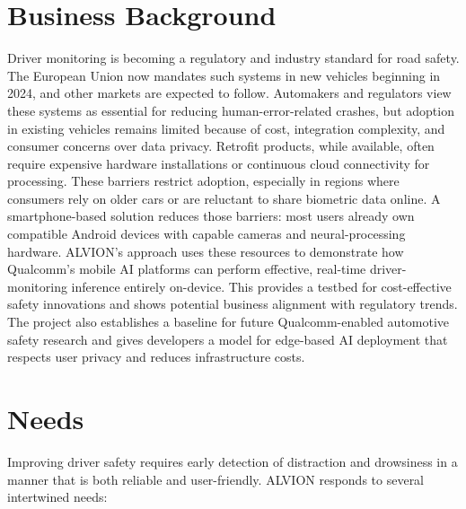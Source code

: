\documentclass[11pt]{report}
\begin{document}
\section{Business Background}
Driver monitoring is becoming a regulatory and industry standard for road safety. The European Union now mandates such systems in new vehicles beginning in 2024, and other markets are expected to follow. Automakers and regulators view these systems as essential for reducing human-error-related crashes, but adoption in existing vehicles remains limited because of cost, integration complexity, and consumer concerns over data privacy.
Retrofit products, while available, often require expensive hardware installations or continuous cloud connectivity for processing. These barriers restrict adoption, especially in regions where consumers rely on older cars or are reluctant to share biometric data online. A smartphone-based solution reduces those barriers: most users already own compatible Android devices with capable cameras and neural-processing hardware.
ALVION’s approach uses these resources to demonstrate how Qualcomm’s mobile AI platforms can perform effective, real-time driver-monitoring inference entirely on-device. This provides a testbed for cost-effective safety innovations and shows potential business alignment with regulatory trends. The project also establishes a baseline for future Qualcomm-enabled automotive safety research and gives developers a model for edge-based AI deployment that respects user privacy and reduces infrastructure costs.

\clearpage

\section{Needs}
Improving driver safety requires early detection of distraction and drowsiness in a manner that is both reliable and user-friendly. ALVION responds to several intertwined needs:
\end{document}
